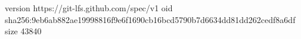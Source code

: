 version https://git-lfs.github.com/spec/v1
oid sha256:9eb6ab882ae19998816f9e6f1690cb16bcd5790b7d6634dd81dd262cedf8a6df
size 43840

